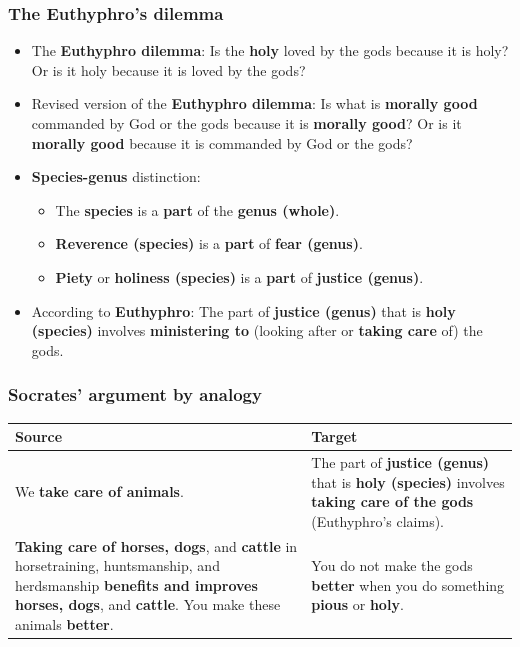 \documentclass[11pt]{article}
\begin{document}
\subsubsection{The Euthyphro's dilemma}
\label{sec:org5347a50}
\begin{itemize}
\item The \textbf{Euthyphro dilemma}:
Is the \textbf{holy} loved by the gods because it is holy? Or is it holy because it is loved by the gods?
\item Revised version of the \textbf{Euthyphro dilemma}:
Is what is \textbf{morally good} commanded by God or the gods because it is \textbf{morally good}? Or is it \textbf{morally good} because it is commanded by God or the gods?
\item \textbf{Species-genus} distinction:
\begin{itemize}
\item The \textbf{species} is a \textbf{part} of the \textbf{genus (whole)}.
\item \textbf{Reverence (species)} is a \textbf{part} of \textbf{fear (genus)}.
\item \textbf{Piety} or \textbf{holiness (species)} is a \textbf{part} of \textbf{justice (genus)}.
\end{itemize}
\item According to \textbf{Euthyphro}:
The part of \textbf{justice (genus)} that is \textbf{holy (species)} involves \textbf{ministering to} (looking after or \textbf{taking care} of) the gods.
\end{itemize}
\subsubsection{Socrates' argument by analogy}
\label{sec:org99b65fc}
\begin{center}
\begin{tabularx}{\textwidth}{|X|X|}
\hline
Source & Target\\
\hline
We \textbf{take care of animals}. & The part of \textbf{justice (genus)} that is \textbf{holy (species)} involves \textbf{taking care of the gods} (Euthyphro's claims).\\
\hline
\textbf{Taking care of horses, dogs}, and \textbf{cattle} in horsetraining, huntsmanship, and herdsmanship \textbf{benefits and improves horses, dogs}, and \textbf{cattle}. You make these animals \textbf{better}. & You do not make the gods \textbf{better} when you do something \textbf{pious} or \textbf{holy}.\\
\hline
\end{tabularx}
\end{center}
\end{document}
